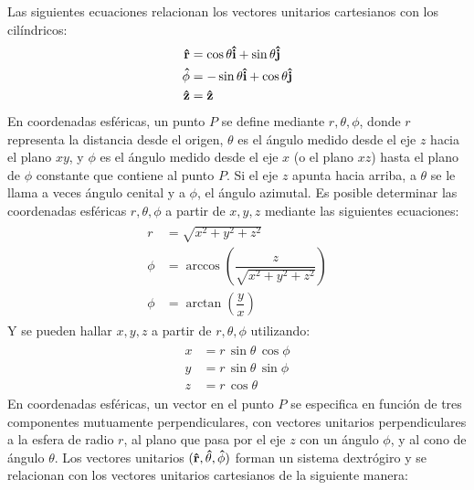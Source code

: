 \documentclass[hidelinks,12pt]{article}
\begin{document}
\par
Las siguientes ecuaciones relacionan los vectores unitarios cartesianos con los cilíndricos:
\begin{align}
\begin{aligned}
    \vu{r} &= \cos \theta \vu{i} + \sin \theta \vu{j} \\
    \vu{\phi} &= -\sin \theta \vu{i} + \cos \theta \vu{j} \\
    \vu{z} &= \vu{z}
\end{aligned}
\label{eq:ecuacion_01_14}
\end{align}
En coordenadas esféricas, un punto $P$ se define mediante $r, \theta, \phi$, donde $r$ representa la distancia desde el origen, $\theta$ es el ángulo medido desde el eje $z$ hacia el plano $xy$, y $\phi$ es el ángulo medido desde el eje $x$ (o el plano $xz$) hasta el plano de $\phi$ constante que contiene al punto $P$. Si el eje $z$ apunta hacia arriba, a $\theta$ se le llama a veces ángulo cenital y a $\phi$, el ángulo azimutal. Es posible determinar las coordenadas esféricas $r, \theta, \phi$ a partir de $x, y, z$ mediante las siguientes ecuaciones:
\begin{align}
\begin{aligned}
    r &= \sqrt{x^{2} + y^{2} + z^{2}} \\[0.5em]
    \phi &= \arccos \left( \dfrac{z}{\sqrt{x^{2} + y^{2} + z^{2}}} \right) \\[0.5em]
    \phi &= \arctan \left( \dfrac{y}{x} \right)
\end{aligned}
\label{eq:ecuacion_01_15}
\end{align}
Y se pueden hallar $x, y, z$ a partir de $r, \theta, \phi$ utilizando:
\begin{align}
\begin{aligned}
    x &= r \, \sin \theta \, \cos \phi \\
    y &= r \, \sin \theta \, \sin \phi \\
    z &= r \, \cos \theta
\end{aligned}
\label{eq:ecuacion_01_16}
\end{align}
En coordenadas esféricas, un vector en el punto $P$ se especifica en función de tres componentes mutuamente perpendiculares, con vectores unitarios perpendiculares a la esfera de radio $r$, al plano que pasa por el eje $z$ con un ángulo $\phi$, y al cono de ángulo $\theta$. Los vectores unitarios $(\vu{r}, \vu{\theta}, \vu{\phi})$ forman un sistema dextrógiro y se relacionan con los vectores unitarios cartesianos de la siguiente manera:
\end{document}
